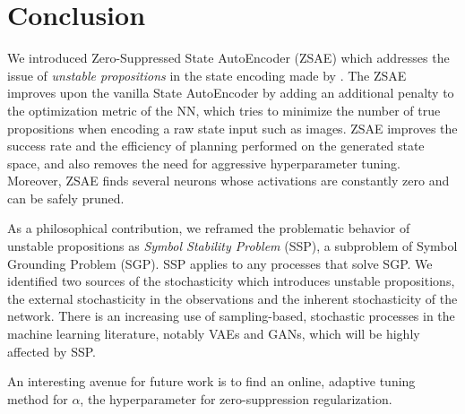 
\section{Conclusion}
\label{conclusion}

We introduced Zero-Suppressed State AutoEncoder (ZSAE) which addresses
the issue of \emph{unstable propositions} in the state encoding made by
\latentplanner.
% 
The ZSAE improves upon the
vanilla State AutoEncoder \cite[SAE]{Asai2018} by
adding an additional penalty to the optimization metric of
the NN, which tries to minimize the number of true propositions
when encoding a raw state input such as images.
% 
ZSAE improves the success rate and the efficiency of planning performed on
the generated state space, and also removes the need for aggressive
hyperparameter tuning.
% 
Moreover, 
ZSAE finds several neurons whose activations are constantly zero
and can be safely pruned.

As a philosophical contribution,
we reframed the problematic behavior of unstable propositions
as \emph{Symbol Stability Problem} (SSP), a subproblem of Symbol Grounding Problem (SGP).
SSP applies to any processes that solve SGP.
% 
We identified two sources of the stochasticity which introduces unstable propositions,
the external stochasticity in the observations and the inherent stochasticity of the network.
There is an increasing use of sampling-based, stochastic processes in
the machine learning literature, notably VAEs and GANs,
which will be highly affected by SSP.

An interesting avenue for future work is to 
find an online, adaptive tuning method for $\alpha$, the hyperparameter for
zero-suppression regularization.
